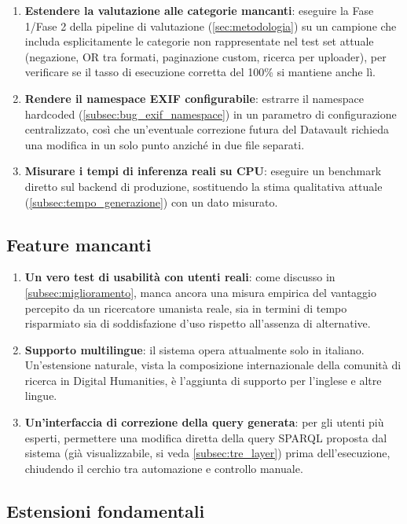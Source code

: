 \begin{enumerate}
    \item \textbf{Estendere la valutazione alle categorie mancanti}: eseguire la Fase 1/Fase 2 della pipeline di valutazione (\cref{sec:metodologia}) su un campione che includa esplicitamente le categorie non rappresentate nel test set attuale (negazione, OR tra formati, paginazione custom, ricerca per uploader), per verificare se il tasso di esecuzione corretta del 100\% si mantiene anche lì.
    \item \textbf{Rendere il namespace EXIF configurabile}: estrarre il namespace hardcoded (\cref{subsec:bug_exif_namespace}) in un parametro di configurazione centralizzato, così che un'eventuale correzione futura del Datavault richieda una modifica in un solo punto anziché in due file separati.
    \item \textbf{Misurare i tempi di inferenza reali su CPU}: eseguire un benchmark diretto sul backend di produzione, sostituendo la stima qualitativa attuale (\cref{subsec:tempo_generazione}) con un dato misurato.
\end{enumerate}

\subsection{Feature mancanti}\label{subsec:feature_mancanti}

\begin{enumerate}
    \item \textbf{Un vero test di usabilità con utenti reali}: come discusso in \cref{subsec:miglioramento}, manca ancora una misura empirica del vantaggio percepito da un ricercatore umanista reale, sia in termini di tempo risparmiato sia di soddisfazione d'uso rispetto all'assenza di alternative.
    \item \textbf{Supporto multilingue}: il sistema opera attualmente solo in italiano. Un'estensione naturale, vista la composizione internazionale della comunità di ricerca in Digital Humanities, è l'aggiunta di supporto per l'inglese e altre lingue.
    \item \textbf{Un'interfaccia di correzione della query generata}: per gli utenti più esperti, permettere una modifica diretta della query SPARQL proposta dal sistema (già visualizzabile, si veda \cref{subsec:tre_layer}) prima dell'esecuzione, chiudendo il cerchio tra automazione e controllo manuale.
\end{enumerate}

\subsection{Estensioni fondamentali}\label{subsec:estensioni_fondamentali}

